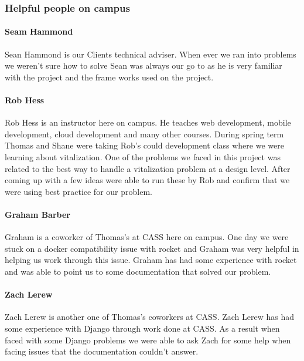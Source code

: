 \documentclass[onecolumn, draftclsnofoot,10pt, compsoc]{article}
\begin{document}
        \subsubsection{Helpful people on campus}
            \paragraph{Seam Hammond} Sean Hammond is our Clients technical adviser. When ever we ran into problems we weren't sure how to solve Sean was always our go to as he is very familiar with the project and the frame works used on the project.\\

            \paragraph{Rob Hess} Rob Hess is an instructor here on campus. He teaches web development, mobile development, cloud development and many other courses. During spring term Thomas and Shane were taking Rob's could development class where we were learning about vitalization. One of the problems we faced in this project was related to the best way to handle a vitalization problem at a design level. After coming up with a few ideas were able to run these by Rob and confirm that we were  using best practice for our problem.\\

            \paragraph{Graham Barber} Graham is a coworker of Thomas's at CASS here on campus. One day we were stuck on a docker compatibility issue with rocket and Graham was very helpful in helping us work through this issue. Graham has had some experience with rocket and was able to point us to some documentation that solved our problem.

            \paragraph{Zach Lerew} Zach Lerew is another one of Thomas's coworkers at CASS. Zach Lerew has had some experience with Django through work done at CASS. As a result when faced with some Django problems we were able to ask Zach for some help when facing issues that the documentation couldn't answer.\\

\end{document}
